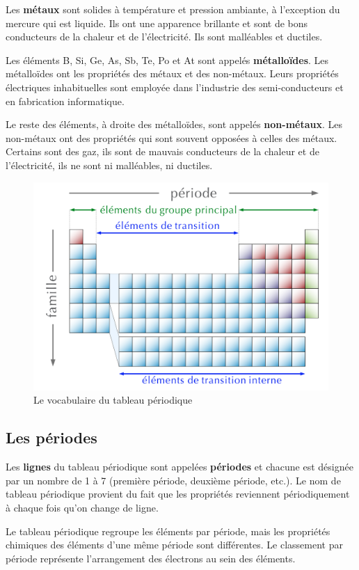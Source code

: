 \documentclass[
  11pt,
  a4paper,
  openany]{book}
\begin{document}
Les \textbf{métaux} sont solides à température et pression ambiante, à l'exception du mercure qui est liquide. Ils ont une apparence brillante et sont de bons conducteurs de la chaleur et de l'électricité. Ils sont malléables et ductiles.

Les éléments B, Si, Ge, As, Sb, Te, Po et At sont appelés \textbf{métalloïdes}. Les métalloïdes ont les propriétés des métaux et des non-métaux. Leurs propriétés électriques inhabituelles sont employée dans l'industrie des semi-conducteurs et en fabrication informatique.

Le reste des éléments, à droite des métalloïdes, sont appelés \textbf{non-métaux}. Les non-métaux ont des propriétés qui sont souvent opposées à celles des métaux. Certains sont des gaz, ils sont de mauvais conducteurs de la chaleur et de l'électricité, ils ne sont ni malléables, ni ductiles.

\begin{figure}

{\centering \includegraphics[width=0.45\linewidth]{images/tpe-empty} 

}

\caption{Le vocabulaire du tableau périodique}\label{fig:tpe-empty}
\end{figure}

\subsection{Les périodes}\label{les-puxe9riodes}

Les \textbf{lignes} du tableau périodique sont appelées \textbf{périodes} et chacune est désignée par un nombre de 1 à 7 (première période, deuxième période, etc.). Le nom de tableau périodique provient du fait que les propriétés reviennent périodiquement à chaque fois qu'on change de ligne.

Le tableau périodique regroupe les éléments par période, mais les propriétés chimiques des éléments d'une même période sont différentes. Le classement par période représente l'arrangement des électrons au sein des éléments.
\end{document}
